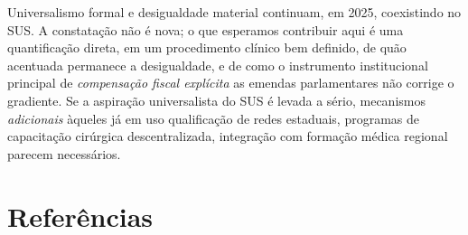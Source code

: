 \documentclass[12pt,a4paper,oneside]{article}
\begin{document}
Universalismo formal e desigualdade material continuam, em 2025,
coexistindo no SUS. A constatação não é nova; o que esperamos
contribuir aqui é uma quantificação direta, em um procedimento
clínico bem definido, de quão acentuada permanece a desigualdade,
e de como o instrumento institucional principal de
\textit{compensação fiscal explícita} \textemdash{} as emendas
parlamentares \textemdash{} não corrige o gradiente. Se a aspiração
universalista do SUS é levada a sério, mecanismos
\textit{adicionais} àqueles já em uso \textemdash{} qualificação
de redes estaduais, programas de capacitação cirúrgica
descentralizada, integração com formação médica regional
\textemdash{} parecem necessários.

\section*{Referências}\label{sec:ref}
\end{document}
